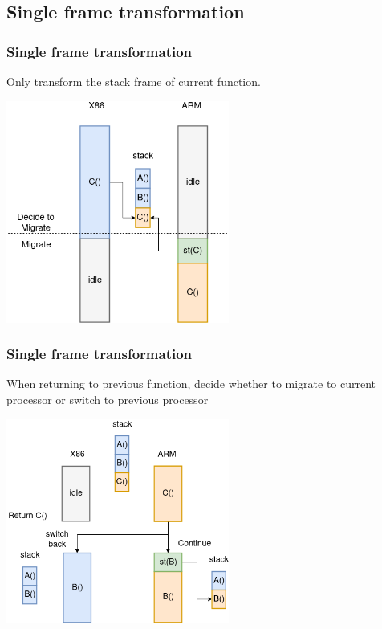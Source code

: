 \documentclass[10pt]{beamer}
\begin{document}



\subsection{Single frame transformation}

\begin{frame}
\frametitle{Single frame transformation}
Only transform the stack frame of current function.

\includegraphics[width=0.55\textwidth]{singleframe_trans}
\end{frame}

\begin{frame}
\frametitle{Single frame transformation}
When returning to previous function, decide whether to migrate to current processor or switch to previous processor

\includegraphics[width=0.55\textwidth]{singleframe_return}
\end{frame}
\end{document}
